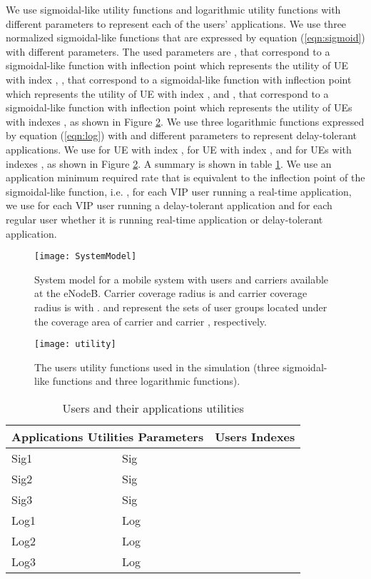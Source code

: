 \documentclass[journal]{IEEEtran} 				\IEEEoverridecommandlockouts 						\usepackage{amsmath,amssymb}
\begin{document}
We use sigmoidal-like utility functions and logarithmic utility functions with different parameters to represent each of the users' applications. We use three normalized sigmoidal-like functions that are expressed by equation (\ref{eqn:sigmoid}) with different parameters. The used parameters are ,  that correspond to a sigmoidal-like function with inflection point  which represents the utility of UE with index , ,  that correspond to a sigmoidal-like function with inflection point  which represents the utility of UE with index , and ,   that correspond to a sigmoidal-like function with inflection point  which represents the utility of UEs with indexes , as shown in Figure \ref{fig:utility}. We use three logarithmic functions expressed by equation (\ref{eqn:log}) with  and different  parameters to represent delay-tolerant applications. We use  for UE with index ,  for UE with index , and  for UEs with indexes , as shown in Figure \ref{fig:utility}. A summary is shown in table \ref{table:parameters}. We use an application minimum required rate that is equivalent to the inflection point of the sigmoidal-like function, i.e. , for each VIP user running a real-time application, we use  for each VIP user running a delay-tolerant application and  for each regular user whether it is running real-time application or delay-tolerant application.
\begin{figure}[tb]
\centering
\texttt{[image: SystemModel]}
\caption{System model for a mobile system with  users and  carriers available at the eNodeB. Carrier  coverage radius is  and carrier  coverage radius is  with .  and  represent the sets of user groups located under the coverage area of carrier  and carrier , respectively.}
\label{fig:SystemModel}
\end{figure}
\begin{figure}[tb]
\centering
\texttt{[image: utility]}
\caption{The users utility functions  used in the simulation (three sigmoidal-like functions and three logarithmic functions).}
\label{fig:utility}
\end{figure}
\begin {table}[]
\caption {Users and their applications utilities}
\label{table:parameters}
\begin{center}
\renewcommand{\arraystretch}{1.4} \begin{tabular}{| l | l | l | }
\hline
  \multicolumn{2}{|c|}{Applications Utilities Parameters} & \multicolumn{1}{|c|}{Users Indexes} \\  \hline
  Sig1 & Sig   &   \\ \hline
  Sig2 & Sig  &   \\ \hline
  Sig3 & Sig  &    \\ \hline
  Log1 & Log  &    \\ \hline
  Log2 & Log  &    \\ \hline
  Log3 & Log  &  \\ \hline
\end{tabular}
\end{center}
\end {table}
\end{document}

